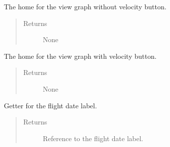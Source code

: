 \documentclass[letterpaper,10pt,english]{sphinxmanual}
\begin{document}
\begin{fulllineitems}
\begin{fulllineitems}
\begin{quote}
\begin{description}
\end{description}\end{quote}

\end{fulllineitems}


\begin{fulllineitems}
\label{\detokenize{index:src.Views.View_ReportScreen.ReportWindow.BtnViewGraphNoVelocity}}
The home for the view graph without velocity button.
\begin{quote}\begin{description}
\item[{Returns}] \leavevmode
None

\end{description}\end{quote}

\end{fulllineitems}


\begin{fulllineitems}
\label{\detokenize{index:src.Views.View_ReportScreen.ReportWindow.BtnViewGraphVelocity}}
The home for the view graph with velocity button.
\begin{quote}\begin{description}
\item[{Returns}] \leavevmode
None

\end{description}\end{quote}

\end{fulllineitems}


\begin{fulllineitems}
\label{\detokenize{index:src.Views.View_ReportScreen.ReportWindow.LblFlightDate}}
Getter for the flight date label.
\begin{quote}\begin{description}
\item[{Returns}] \leavevmode
Reference to the flight date label.


\end{description}
\end{quote}
\end{fulllineitems}
\end{fulllineitems}
\end{document}
